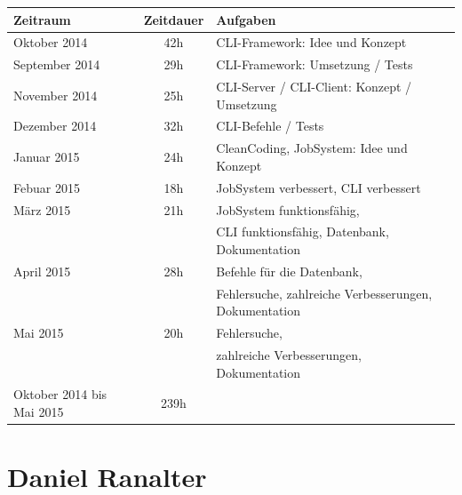 \documentclass[12pt,a4paper]{report}
\begin{document}
\begin{onehalfspace}
\begin{center}
\begin{tabular}{|l|c|l|}
\hline
\textbf{Zeitraum} & \textbf{Zeitdauer} & \textbf{Aufgaben} \\ \hline \hline
Oktober 2014 & 42h & CLI-Framework: Idee und Konzept\\ \hline
September 2014 & 29h & CLI-Framework: Umsetzung / Tests\\ \hline
November 2014 & 25h & CLI-Server / CLI-Client: Konzept / Umsetzung\\ \hline
Dezember 2014 & 32h & CLI-Befehle / Tests\\ \hline
Januar 2015 & 24h & CleanCoding, JobSystem: Idee und Konzept\\ \hline
Febuar 2015 & 18h & JobSystem verbessert, CLI verbessert\\ \hline
März 2015 & 21h & JobSystem funktionsfähig, \\&& CLI funktionsfähig, Datenbank, Dokumentation\\ \hline
April 2015 & 28h & Befehle für die Datenbank, \\&& Fehlersuche, zahlreiche Verbesserungen,  Dokumentation \\ \hline
Mai 2015 & 20h & Fehlersuche,\\&& zahlreiche Verbesserungen, Dokumentation\\
\hline \hline
Oktober 2014 bis Mai 2015 & 239h &\\ \hline

\end{tabular}
\end{center}

\chapter{Daniel Ranalter}

\begin{tabular}{|l|c|l|}


\end{tabular}
\end{onehalfspace}
\end{document}
